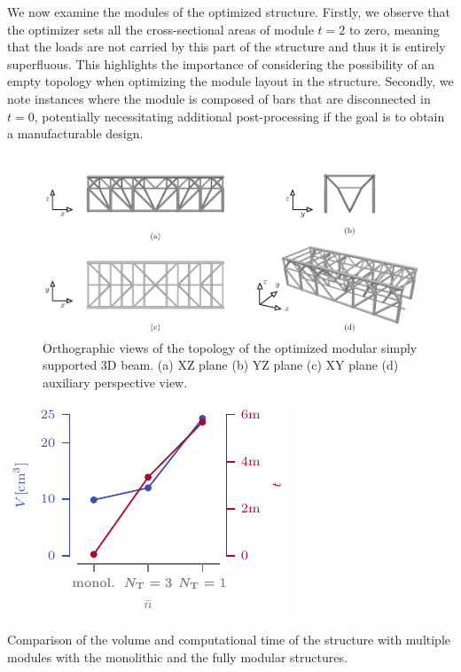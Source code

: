 We now examine the modules of the optimized structure. Firstly, we observe that the optimizer sets all the cross-sectional areas of module $t=2$ to zero, meaning that the loads are not carried by this part of the structure and thus it is entirely superfluous. This highlights the importance of considering the possibility of an empty topology when optimizing the module layout in the structure. Secondly, we note instances where the module is composed of bars that are disconnected \eg in $t=0$, potentially necessitating additional post-processing if the goal is to obtain a manufacturable design.

\begin{figure}
    \centering
    \includegraphics{figures/05_cellular_opt/00_multiple_topology/support_sol.pdf}
    \caption{Orthographic views of the topology of the optimized modular simply supported 3D beam. (a) XZ plane (b) YZ plane (c) XY plane (d) auxiliary perspective view.}
    \label{fig:05_multiple_topology_sol}
\end{figure}

\begin{marginfigure}
    \centering
    \includegraphics[width=\linewidth]{figures/05_cellular_opt/00_multiple_tab/multi_tab.pdf}
    \caption{Comparison of the volume and computational time of the structure with multiple modules with the monolithic and the fully modular structures.}
    \label{fig:05_multiple_topology_sol_graph}
\end{marginfigure}

